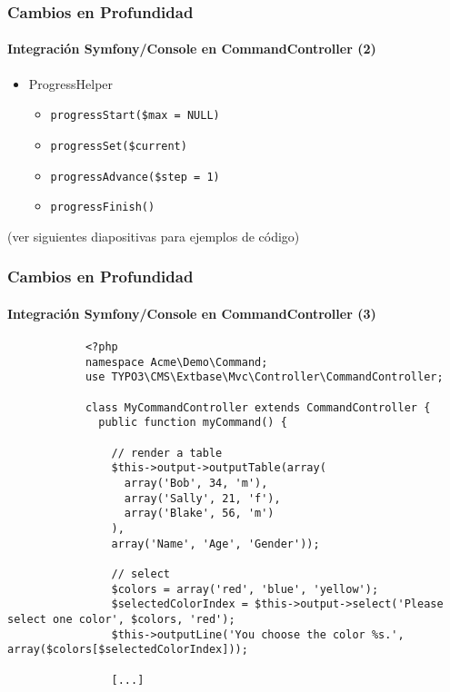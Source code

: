 \begin{frame}[fragile]
	\frametitle{Cambios en Profundidad}
	\framesubtitle{Integración Symfony/Console en CommandController (2)}

	\lstset{basicstyle=\tiny\ttfamily}

	\begin{itemize}
		\item \smaller ProgressHelper
			\begin{itemize}
				\item \smaller\texttt{progressStart(\$max = NULL)}
				\item \texttt{progressSet(\$current)}
				\item \texttt{progressAdvance(\$step = 1)}
				\item \texttt{progressFinish()}
			\end{itemize}
	\end{itemize}

	\smaller
		(ver siguientes diapositivas para ejemplos de código)
	\normalsize

\end{frame}


\begin{frame}[fragile]
	\frametitle{Cambios en Profundidad}
	\framesubtitle{Integración Symfony/Console en CommandController (3)}

	\lstset{basicstyle=\tiny\ttfamily}

		\begin{lstlisting}
			<?php
			namespace Acme\Demo\Command;
			use TYPO3\CMS\Extbase\Mvc\Controller\CommandController;

			class MyCommandController extends CommandController {
			  public function myCommand() {

			    // render a table
			    $this->output->outputTable(array(
			      array('Bob', 34, 'm'),
			      array('Sally', 21, 'f'),
			      array('Blake', 56, 'm')
			    ),
			    array('Name', 'Age', 'Gender'));

			    // select
			    $colors = array('red', 'blue', 'yellow');
			    $selectedColorIndex = $this->output->select('Please select one color', $colors, 'red');
			    $this->outputLine('You choose the color %s.', array($colors[$selectedColorIndex]));

			    [...]
		\end{lstlisting}

\end{frame}

